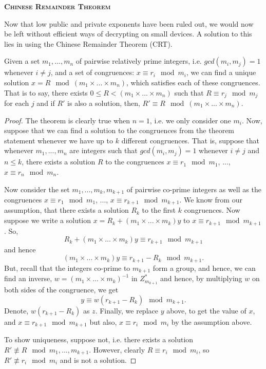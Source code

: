 \vspace{0.25cm}
\noindent\textsc{\textbf{Chinese Remainder Theorem}}


Now that low public and private exponents have been ruled out, we would now be left without efficient ways of decrypting on small devices. A solution to this lies in using the Chinese Remainder Theorem (CRT).
\begin{thm}
Given a set $m_1, ..., m_n$ of pairwise relatively prime integers, i.e. $gcd(m_i, m_j) = 1$ whenever $i\neq j$, and a set of congruences: $x \equiv r_i \mod m_i$, we can find a unique solution $x = R\mod (m_1\times ...\times m_n)$, which satisfies each of these congruences. That is to say, there exists $0\leq R < (m_1\times ...\times m_n)$ such that $R\equiv r_j \mod m_j$ for each $j$ and if $R'$ is also a solution, then, $R'\equiv R\mod (m_1\times ...\times m_n)$. 
\end{thm}
\begin{proof}
The theorem is clearly true when $n = 1$, i.e. we only consider one $m_i$. Now, suppose that we can find a solution to the congruences from the theorem statement whenever we have up to $k$ different congruences. That is, suppose that whenever $m_1, ..., m_n$ are integers such that $gcd(m_i, m_j) = 1$ whenever $i\neq j$ and $n\leq k$, there exists a solution $R$ to the congruences $x \equiv r_1 \mod m_1$, ..., $x\equiv r_n \mod m_n$. 

Now consider the set $m_1, ..., m_k, m_{k+1}$ of pairwise co-prime integers as well as the congruences $x \equiv r_1 \mod m_1$, ..., $x\equiv r_{k+1} \mod m_{k+1}$. We know from our assumption, that there exists a solution $R_k$ to the first $k$ congruences. Now suppose we write a solution $x = R_k + (m_1\times ... \times m_k)y$ to $x \equiv r_{k+1}\mod m_{k+1}$. So, 
\[
R_k + (m_1\times ... \times m_k)y \equiv r_{k+1}\mod m_{k+1}
\]
and hence
\[
(m_1\times ... \times m_k)y \equiv r_{k+1} - R_k\mod m_{k+1}.
\]
But, recall that the integers co-prime to $m_{k+1}$ form a group, and hence, we can find an inverse, $w = (m_1\times ... \times m_k)^{-1}$ in $Z_{m_{k+1}}^*$ and hence, by multiplying $w$ on both sides of the congruence, we get 
\[
y \equiv w(r_{k+1} - R_k)\mod m_{k+1}.
\]
Denote, $w(r_{k+1} - R_k)$ as $z$. Finally, we replace $y$ above, to get the value of $x$, and $x \equiv r_{k+1}\mod m_{k+1}$ but also, $x \equiv r_i\mod m_i$ by the assumption above.

To show uniqueness, suppose not, i.e. there exists a solution $R'\not\equiv R\mod m_1, ..., m_{k+1}$. However, clearly $R\equiv r_i \mod m_i$, so $R'\not\equiv r_i \mod m_i$ and is not a solution. 
\end{proof}

